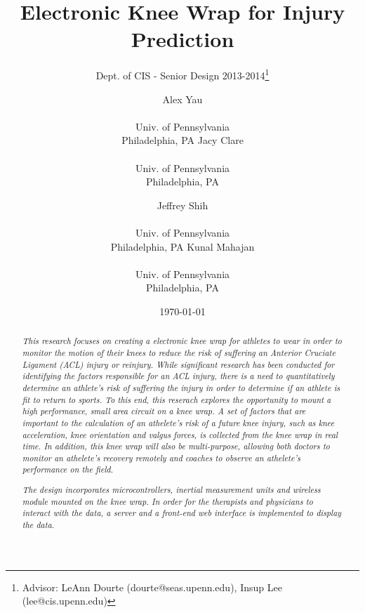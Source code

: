 \documentclass{sig-alternate}
\begin{document}
\nocite{*}
\title{Electronic Knee Wrap for Injury Prediction}
\subtitle{Dept. of CIS - Senior Design 2013-2014\thanks{Advisor: LeAnn Dourte (dourte@seas.upenn.edu), Insup Lee (lee@cis.upenn.edu)}}
\author{
\alignauthor Alex Yau \\  \\ Univ. of Pennsylvania \\ Philadelphia, PA
\alignauthor Jacy Clare \\  \\ Univ. of Pennsylvania \\ Philadelphia, PA
\and
\alignauthor Jeffrey Shih \\  \\ Univ. of Pennsylvania \\ Philadelphia, PA
\alignauthor Kunal Mahajan \\  \\ Univ. of Pennsylvania \\ Philadelphia, PA}
\date{\today}
\maketitle

\begin{abstract}

  \textit{This research focuses on creating a electronic knee wrap for athletes to wear in order to monitor the motion of their knees to reduce the risk of suffering an Anterior Cruciate Ligament (ACL) injury or reinjury. While significant research has been conducted for identifying the factors responsible for an ACL injury, there is a need to quantitatively determine an athlete's risk of suffering the injury in order to determine if an athlete is fit to return to sports. To this end, this reserach explores the opportunity to mount a high performance, small area circuit on a knee wrap. A set of factors that are important to the calculation of an athelete's risk of a future knee injury, such as knee acceleration, knee orientation and valgus forces, is collected from the knee wrap in real time. In addition, this knee wrap will also be multi-purpose, allowing both doctors to monitor an athelete's recovery remotely and coaches to observe an athelete's performance on the field.}

  \textit{The design incorporates microcontrollers, inertial measurement units and wireless module mounted on the knee wrap. In order for the therapists and physicians to interact with the data, a server and a front-end web interface is implemented to display the data.}

\end{abstract}
\end{document}
